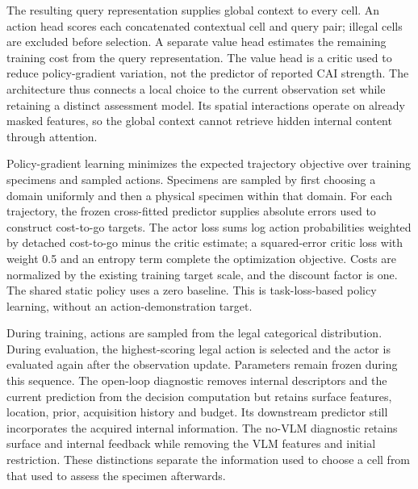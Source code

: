 The resulting query representation supplies global context to every cell. An action head scores each concatenated contextual cell and query pair; illegal cells are excluded before selection. A separate value head estimates the remaining training cost from the query representation. The value head is a critic used to reduce policy-gradient variation, not the predictor of reported CAI strength. The architecture thus connects a local choice to the current observation set while retaining a distinct assessment model. Its spatial interactions operate on already masked features, so the global context cannot retrieve hidden internal content through attention.

Policy-gradient learning \citep{williams1992} minimizes the expected trajectory objective over training specimens and sampled actions. Specimens are sampled by first choosing a domain uniformly and then a physical specimen within that domain. For each trajectory, the frozen cross-fitted predictor supplies absolute errors used to construct cost-to-go targets. The actor loss sums log action probabilities weighted by detached cost-to-go minus the critic estimate; a squared-error critic loss with weight 0.5 and an entropy term complete the optimization objective. Costs are normalized by the existing training target scale, and the discount factor is one. The shared static policy uses a zero baseline. This is task-loss-based policy learning, without an action-demonstration target.

During training, actions are sampled from the legal categorical distribution. During evaluation, the highest-scoring legal action is selected and the actor is evaluated again after the observation update. Parameters remain frozen during this sequence. The open-loop diagnostic removes internal descriptors and the current prediction from the decision computation but retains surface features, location, prior, acquisition history and budget. Its downstream predictor still incorporates the acquired internal information. The no-VLM diagnostic retains surface and internal feedback while removing the VLM features and initial restriction. These distinctions separate the information used to choose a cell from that used to assess the specimen afterwards.

